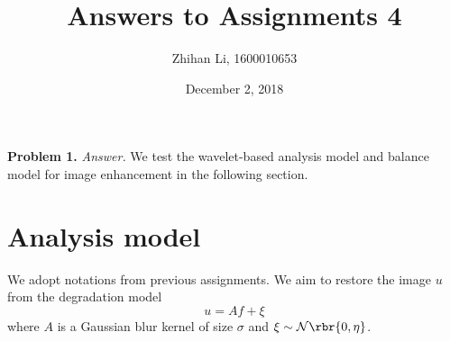 \documentclass[english, nochinese]{pnote}
\title{Answers to Assignments 4}
\author{Zhihan Li, 1600010653}
\date{December 2, 2018}
\begin{document}
\maketitle

\textbf{Problem 1.} \textit{Answer.} We test the wavelet-based analysis model and balance model for image enhancement in the following section.

\section{Analysis model}

We adopt notations from previous assignments. We aim to restore the image $u$ from the degradation model
\begin{equation}
u = A f + \xi
\end{equation}
where $A$ is a Gaussian blur kernel of size $\sigma$ and $ \xi \sim \mathcal{N} \rbr{ 0, \eta } $.
\end{document}
